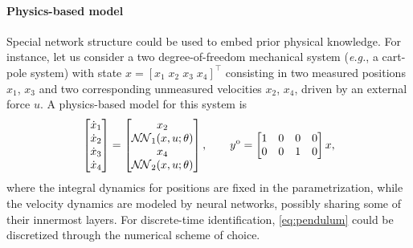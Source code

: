 \documentclass{article}
\newcommand{\NN}{\mathcal{N\!N}} %
\newcommand{\ymodel}{y^{\rm o}}
\begin{document}
\paragraph{Physics-based model}
Special network structure could  be used to embed prior physical knowledge. For instance, let us consider a two degree-of-freedom mechanical system (\emph{e.g.}, a cart-pole system) with state $x=[x_1\; x_2\; x_3\; x_4]^\top$ consisting in two measured positions $x_1$, $x_3$ and two corresponding unmeasured velocities $x_2$, $x_4$, driven by an external force $u$. A physics-based model for this system is
\begin{equation}
\label{eq:pendulum}
 \begin{bmatrix}
    \dot x_1   \\ 
    \dot x_2 \\
    \dot x_3 \\
    \dot x_4
  \end{bmatrix} = 
  \begin{bmatrix}
   x_2 \\
   \NN_1(x, u; \theta) \\
   x_4 \\
   \NN_2(x, u;\theta)
  \end{bmatrix}, \qquad
	\ymodel = \begin{bmatrix}
			1 & 0 & 0 & 0 \\
			0 & 0 & 1 & 0
			\end{bmatrix}
			x,
\end{equation}
where the integral dynamics for positions are fixed in the parametrization, while the velocity dynamics are modeled by neural networks, possibly sharing some of their innermost layers. 
For discrete-time identification, \eqref{eq:pendulum} could be discretized through the numerical scheme of choice.
\end{document}
